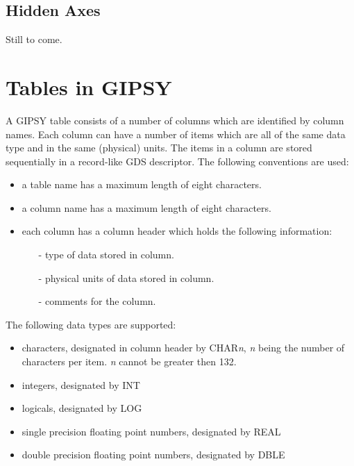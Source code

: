 \section{Hidden Axes}

Still to come.

\chapter{Tables in GIPSY}

A GIPSY table consists of a number of columns which are identified by
column names.  Each column can have a number of items
which are all of the same data type and in the same (physical) units.
The items in a column are stored sequentially in a record-like
GDS descriptor.  The following conventions are used:

\begin{itemize}

\item a table name has a maximum length of eight characters.

\item a column name has a maximum length of eight characters.

\item each column has a column header which holds the following
information:
\begin{itemize}

\item[-] type of data stored in column.

\item[-] physical units of data stored in column.

\item[-] comments for the column.

\end{itemize}
\end{itemize}

\noindent The following data types are supported:

\begin{itemize}
\item characters, designated in column header by CHAR{\it n}, {\it n}
being the number of characters per item.  {\it n} cannot be greater then
132.
\item integers, designated by INT
\item logicals, designated by LOG
\item single precision floating point numbers, designated by REAL
\item double precision floating point numbers, designated by DBLE
\end{itemize}

